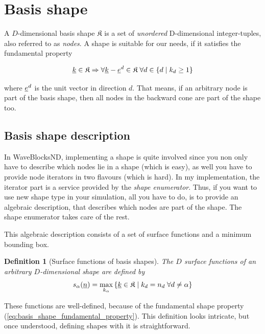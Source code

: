 \documentclass{article}
\newtheorem{definition}{Definition}
\begin{document}
\tableofcontents
\clearpage

\section{Basis shape}

A \(D\)-dimensional basis shape \(\mathfrak{K}\)
is a set of \emph{unordered} D-dimensional integer-tuples, also
referred to as \emph{nodes}.  A shape is suitable for our needs, if it
satisfies the fundamental property

\begin{equation}
  \label{eq:basis_shape_fundamental_property}
  \underline{k} \in \mathfrak{K} \Rightarrow \forall
  \underline{k}-\underline{e}^d \in \mathfrak{K} \;\forall d \in \{d \;|\;k_d \geq 1\}
\end{equation}

where \(\underline{e}^d\) is the unit vector in direction \(d\).
That means, if an arbitrary node is part of the basis shape, then all nodes
in the backward cone are part of the shape too.

\subsection{Basis shape description}
In WaveBlocksND, implementing a shape is quite involved since you
non only have to describe which nodes lie in a shape (which is easy),
as well you have to provide node iterators in two flavours (which is hard).
In my implementation, the iterator part is a service provided by the
\emph{shape enumerator}. Thus, if you want to use new shape type in your simulation,
all you have to do, is to provide an algebraic description, that describes
which nodes are part of the shape. The shape enumerator takes care of the rest.

This algebraic description consists of a set of surface functions and
a minimum bounding box. 

\begin{definition}[Surface functions of basis shapes]
  The \(D\) surface functions of an arbitrary \(D\)-dimensional shape are defined by
  \begin{equation}
  s_{\alpha}(\underline{n})=\max_{k_{\alpha}}
    \left\{\underline{k} \in \mathfrak{K} \;|\;
      k_d = n_d \; \forall d \neq \alpha
    \right\}
    \label{eq:basis_shape_surface_function}
  \end{equation}
\end{definition}

These functions are well-defined, because of the fundamental shape property
(\ref{eq:basis_shape_fundamental_property}).
This definition looks intricate, but once understood, defining shapes with it
is straightforward.
\end{document}
